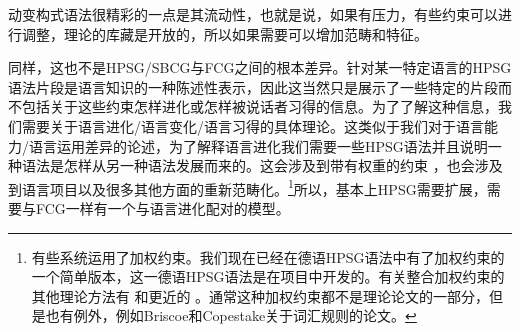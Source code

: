 

动变构式语法很精彩的一点是其流动性，也就是说，如果有压力，有些约束可以进行调整，理论的库藏是开放的，所以如果需要可以增加范畴和特征。

同样，这也不是HPSG/SBCG与FCG之间的根本差异。针对某一特定语言的HPSG语法片段是语言知识的一种陈述性表示，因此这当然只是展示了一些特定的片段而不包括关于这些约束怎样进化或怎样被说话者习得的信息。为了了解这种信息，我们需要关于语言进化/语言变化/语言习得的具体理论。这类似于我们对于语言能力/语言运用差异的论述，为了解释语言进化我们需要一些HPSG语法并且说明一种语法是怎样从另一种语法发展而来的。这会涉及到带有权重的约束 ，也会涉及到语言项目以及很多其他方面的重新范畴化。\footnote{%
有些系统运用了加权约束。我们现在已经在德语HPSG语法中有了加权约束的一个简单版本，这一德语HPSG语法是在\verbmobil 项目中开发的\citep{MK2000a}。有关整合加权约束的其他理论方法有 和更近的 。通常这种加权约束都不是理论论文的一部分，但是也有例外，例如Briscoe和Copestake关于词汇规则的论文\citep{BC99a}。  
}所以，基本上HPSG需要扩展，需要与FCG一样有一个与语言进化配对的模型。
